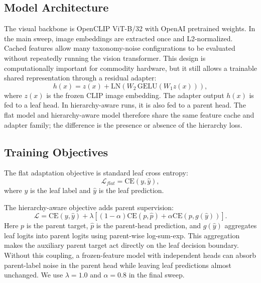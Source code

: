 \documentclass[conference]{IEEEtran}
\begin{document}
\subsection{Model Architecture}
The visual backbone is OpenCLIP ViT-B/32 with OpenAI pretrained weights. In the
main sweep, image embeddings are extracted once and L2-normalized. Cached
features allow many taxonomy-noise configurations to be evaluated without
repeatedly running the vision transformer. This design is computationally
important for commodity hardware, but it still allows a trainable shared
representation through a residual adapter:
\begin{equation}
h(x) = z(x) + \mathrm{LN}(W_2\,\mathrm{GELU}(W_1z(x))),
\end{equation}
where $z(x)$ is the frozen CLIP image embedding. The adapter output $h(x)$ is
fed to a leaf head. In hierarchy-aware runs, it is also fed to a parent head.
The flat model and hierarchy-aware model therefore share the same feature
cache and adapter family; the difference is the presence or absence of the
hierarchy loss.

\subsection{Training Objectives}
The flat adaptation objective is standard leaf cross entropy:
\begin{equation}
\mathcal{L}_{flat} = \mathrm{CE}(y,\hat{y}),
\end{equation}
where $y$ is the leaf label and $\hat{y}$ is the leaf prediction.

The hierarchy-aware objective adds parent supervision:
\begin{equation}
\mathcal{L} =
\mathrm{CE}(y,\hat{y}) +
\lambda\left[(1-\alpha)\mathrm{CE}(p,\hat{p}) +
\alpha\mathrm{CE}(p,g(\hat{y}))\right].
\end{equation}
Here $p$ is the parent target, $\hat{p}$ is the parent-head prediction, and
$g(\hat{y})$ aggregates leaf logits into parent logits using parent-wise
log-sum-exp. This aggregation makes the auxiliary parent target act directly
on the leaf decision boundary. Without this coupling, a frozen-feature model
with independent heads can absorb parent-label noise in the parent head while
leaving leaf predictions almost unchanged. We use $\lambda=1.0$ and
$\alpha=0.8$ in the final sweep.
\end{document}

